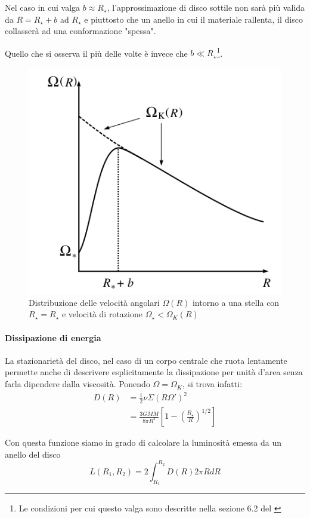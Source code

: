 \documentclass[a4paperbi]{article}
\begin{document}
	Nel caso in cui valga $b\approx R_{\star}$, l'approssimazione di disco sottile non sarà più valida da $R=R_{\star}+b$ ad $R_{\star}$ e piuttosto che un anello in cui il materiale rallenta, il disco collasserà ad una conformazione "spessa".
	
	Quello che si osserva il più delle volte è invece che $b\ll R_{\star}$\footnote{Le condizioni per cui questo valga sono descritte nella sezione 6.2 del \cite{FrankKingRaineAccretionPower}}.	
	
	\begin{figure}[H]
		\centering
		\includegraphics[width=0.7\linewidth]{InnerRegionAngularVelocity}
		\caption{Distribuzione delle velocità angolari $\Omega(R)$ intorno a una stella con $R_{\star}=R_\star$ e velocità di rotazione $\Omega_{\star}<\Omega_K(R)$}
		\label{fig:InnerRegionAngularVelocity}
	\end{figure}
	
	\paragraph{Dissipazione di energia}
	La stazionarietà del disco, nel caso di un corpo centrale che ruota lentamente permette anche di descrivere esplicitamente la dissipazione per unità d'area senza farla dipendere dalla viscosità. Ponendo $\Omega=\Omega_K$, si trova infatti:
	\begin{align}
		D(R)&=\frac{1}{2}\nu\Sigma(R\Omega')^2
			\\&=\frac{3GM\dot{M}}{8\pi R^3}\left[1-\left(\frac{R_{\star}}{R}\right)^{1/2}\right]
	\end{align}	
	
	Con questa funzione siamo in grado di calcolare la luminosità emessa da un anello del disco
	\begin{equation}
		L(R_1,R_2)=2\int_{R_1}^{R_2}D(R)2\pi RdR
	\end{equation}
	
\end{document}
